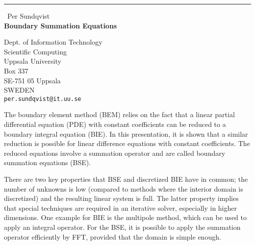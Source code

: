 \documentclass{report}
\begin{document}
\begin{center}
\rule{6in}{1pt} \
{\large Per Sundqvist \\
{\bf Boundary Summation Equations}}

Dept. of Information Technology \\ Scientific Computing \\ Uppsala University \\ Box 337 \\ SE-751 05 Uppsala \\ SWEDEN
\\
{\tt per.sundqvist@it.uu.se}\end{center}

The boundary element method (BEM) relies on the fact that a linear
partial differential equation (PDE) with constant coefficients can be
reduced to a boundary integral equation (BIE). In this presentation,
it is shown that a similar reduction is possible for linear difference
equations with constant coefficients. The reduced equations involve a
summation operator and are called boundary summation equations (BSE).

There are two key properties that BSE and discretized BIE have in
common; the number of unknowns is low (compared to methods where the
interior domain is discretized) and the resulting linear system is
full. The latter property implies that special techniques are required
in an iterative solver, especially in higher dimensions. One example
for BIE is the multipole method, which can be used to apply an
integral operator. For the BSE, it is possible to apply the summation
operator efficiently by FFT, provided that the domain is simple
enough.
\end{document}

